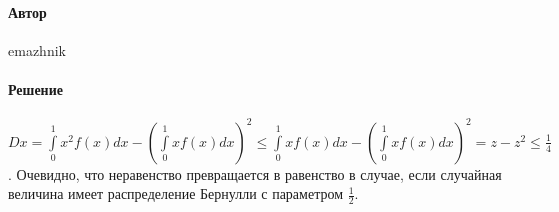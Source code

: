 \documentclass{article}
\begin{document}
\paragraph{Автор} emazhnik
\paragraph{Решение} $Dx = \int\limits_0^1 x^2 f(x) dx - ( \int\limits_0^1 x f(x) dx )^2 \leq \int\limits_0^1 x f(x) dx - ( \int\limits_0^1 x f(x) dx )^2 = z - z^2 \leq \frac14$.
Очевидно, что неравенство превращается в равенство в случае, если случайная величина имеет распределение Бернулли с параметром $\frac12$.
\end{document}

